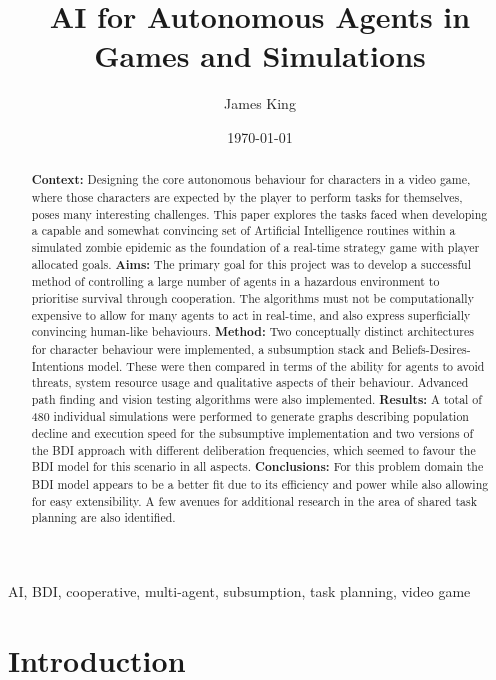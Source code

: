 \documentclass[a4paper,12pt]{article}
\title{AI for Autonomous Agents in Games and Simulations}
\author{James King}
\date{\today}
\begin{document}
\maketitle

\begin{abstract} {\bf Context:} Designing the core autonomous behaviour for characters in a video game, where those characters are expected by the player to perform tasks for themselves, poses many interesting challenges. This paper explores the tasks faced when developing a capable and somewhat convincing set of Artificial Intelligence routines within a simulated zombie epidemic as the foundation of a real-time strategy game with player allocated goals.
{\bf Aims:} The primary goal for this project was to develop a successful method of controlling a large number of agents in a hazardous environment to prioritise survival through cooperation. The algorithms must not be computationally expensive to allow for many agents to act in real-time, and also express superficially convincing human-like behaviours.
{\bf Method:} Two conceptually distinct architectures for character behaviour were implemented, a subsumption stack and Beliefs-Desires-Intentions model. These were then compared in terms of the ability for agents to avoid threats, system resource usage and qualitative aspects of their behaviour. Advanced path finding and vision testing algorithms were also implemented.
{\bf Results:} A total of 480 individual simulations were performed to generate graphs describing population decline and execution speed for the subsumptive implementation and two versions of the BDI approach with different deliberation frequencies, which seemed to favour the BDI model for this scenario in all aspects.
{\bf Conclusions:} For this problem domain the BDI model appears to be a better fit due to its efficiency and power while also allowing for easy extensibility. A few avenues for additional research in the area of shared task planning are also identified.
\end{abstract}

\begin{keywords}
AI, BDI, cooperative, multi-agent, subsumption, task planning, video game
\end{keywords}

\section{Introduction}
\end{document}
